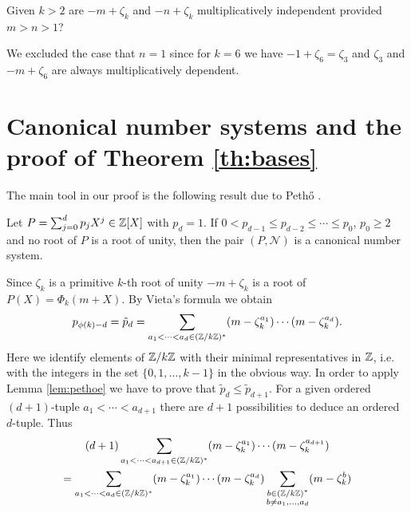 \begin{question}
 Given $k>2$ are $-m+\zeta_k$ and $-n+\zeta_k$ multiplicatively independent provided $m>n>1$?
\end{question}

We excluded the case that $n=1$ since for $k=6$ we have $-1+\zeta_6=\zeta_3$ and $\zeta_3$ and $-m+\zeta_6$ are always multiplicatively 
dependent.


\section{Canonical number systems and the proof of Theorem \ref{th:bases}}

The main tool in our proof is the following result due to Peth{\H o}
\cite{pethoe1991:polynomial_transformation_and}.

\begin{lemma}\label{lem:pethoe}
  Let $P=\sum_{j=0}^dp_jX^j\in{\mathbb Z}[X]$ with $p_d=1$. If $0<p_{d-1}\leq
  p_{d-2}\leq\cdots\leq p_0$, $p_0\geq2$ and no root of $P$ is a root
  of unity, then the pair $(P,\mathcal{N})$ is a canonical number
  system.
\end{lemma}

Since $\zeta_k$ is a primitive $k$-th root of unity $-m+\zeta_k$ is a
root of $P(X)=\Phi_k(m+X)$. By Vieta's formula we obtain
\begin{equation}\label{eq:coeff} p_{\phi(k)-d}=\tilde
  p_d=\sum_{a_1<\cdots<a_d\in({\mathbb Z}/k{\mathbb Z})^*}(m-\zeta_k^{a_1})\cdots(m-\zeta_k^{a_d}).
\end{equation}
Here we identify elements of ${\mathbb Z}/k{\mathbb Z}$ with their minimal
representatives in ${\mathbb Z}$, i.e. with the integers in the set
$\{0,1,\dots, k-1\}$ in the obvious way.  In order to apply Lemma
\ref{lem:pethoe} we have to prove that $\tilde p_d\leq\tilde
p_{d+1}$. For a given ordered $(d+1)$-tuple $a_1<\cdots<a_{d+1}$ there
are $d+1$ possibilities to deduce an ordered $d$-tuple. Thus
\begin{multline*}(d+1)\sum_{a_1<\cdots<a_{d+1}\in({\mathbb Z}/k{\mathbb Z})^*}(m-\zeta_k^{a_1})\cdots(m-\zeta_k^{a_{d+1}})\\
=\sum_{a_1<\cdots<a_{d}\in({\mathbb Z}/k{\mathbb Z})^*}(m-\zeta_k^{a_1})\cdots(m-\zeta_k^{a_{d}})\sum_{\substack{b\in({\mathbb Z}/k{\mathbb Z})^*\\b\neq 
a_1,\ldots,a_d}}(m-\zeta_k^b)
\end{multline*}

